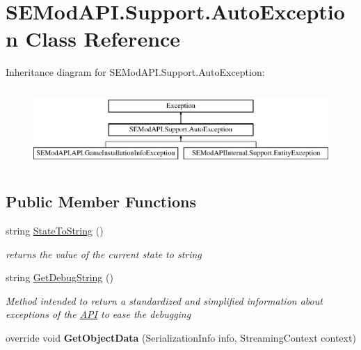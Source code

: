 \hypertarget{class_s_e_mod_a_p_i_1_1_support_1_1_auto_exception}{}\section{S\+E\+Mod\+A\+P\+I.\+Support.\+Auto\+Exception Class Reference}
\label{class_s_e_mod_a_p_i_1_1_support_1_1_auto_exception}


 


Inheritance diagram for S\+E\+Mod\+A\+P\+I.\+Support.\+Auto\+Exception\+:\begin{figure}[H]
\begin{center}
\leavevmode
\includegraphics[height=3.000000cm]{class_s_e_mod_a_p_i_1_1_support_1_1_auto_exception}
\end{center}
\end{figure}
\subsection*{Public Member Functions}
\begin{DoxyCompactItemize}
\item 
string \hyperlink{class_s_e_mod_a_p_i_1_1_support_1_1_auto_exception_a2c8c870c502f75895fbc4e49a58137e3}{State\+To\+String} ()
\begin{DoxyCompactList}\small\item\em returns the value of the current state to string \end{DoxyCompactList}\item 
string \hyperlink{class_s_e_mod_a_p_i_1_1_support_1_1_auto_exception_a4a7fa0c4dced6441b9823c89408dd0ef}{Get\+Debug\+String} ()
\begin{DoxyCompactList}\small\item\em Method intended to return a standardized and simplified information about exceptions of the \hyperlink{namespace_s_e_mod_a_p_i_1_1_a_p_i}{A\+P\+I} to ease the debugging \end{DoxyCompactList}\item 
\hypertarget{class_s_e_mod_a_p_i_1_1_support_1_1_auto_exception_aaf6d54f34e06dcdd16f7cf4863d5bb6f}{}override void {\bfseries Get\+Object\+Data} (Serialization\+Info info, Streaming\+Context context)\label{class_s_e_mod_a_p_i_1_1_support_1_1_auto_exception_aaf6d54f34e06dcdd16f7cf4863d5bb6f}

\end{DoxyCompactItemize}

